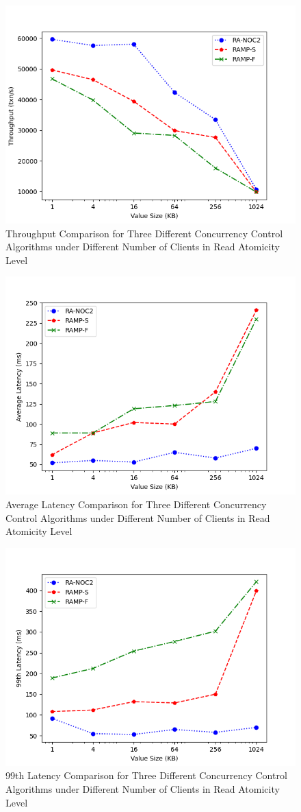 \begin{figure}[H]
    \centering
\includegraphics[width=0.8\linewidth]{figure/5-ra-t.png}
    \caption{Throughput Comparison for Three Different Concurrency Control Algorithms under Different Number of Clients in Read Atomicity Level}
    \label{fig:13}
\end{figure}
\begin{figure}[H]
    \centering
    \includegraphics[width=0.8\linewidth]{figure/5-ra-al.png}
    \caption{Average Latency Comparison for Three Different Concurrency Control Algorithms under Different Number of Clients in Read Atomicity Level}
    \label{fig:14}
\end{figure}
\begin{figure}[H]
    \centering
    \includegraphics[width=0.8\linewidth]{figure/5-ra-l.png}
    \caption{99th Latency Comparison for Three Different Concurrency Control Algorithms under Different Number of Clients in Read Atomicity Level}
    \label{fig:15}
\end{figure}
